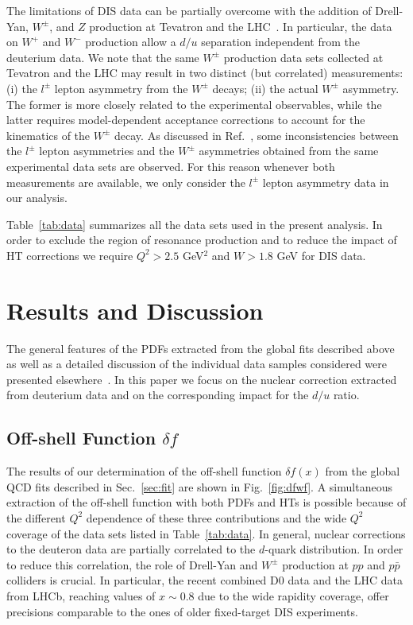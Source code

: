 \documentclass[%
      aps,
      prd,
      floatfix,
      preprintnumbers,
      preprint,
      showpacs,
      nofootinbib,
      tightenlines,
      amssymb,
      amsmath
]{revtex4-1}
\begin{document}
The limitations of DIS data can be partially overcome with the addition of Drell-Yan, $W^\pm$, and $Z$ production 
at Tevatron and the LHC~\cite{Alekhin:2017kpj,Abazov:2013rja,D0:2014kma,Aad:2011dm,Aad:2016naf,Chatrchyan:2013mza,Khachatryan:2016pev,Aaij:2015gna,Aaij:2015vua,Aaij:2015zlq}. 
In particular, the data on $W^+$ and $W^-$ 
production allow a $d/u$ separation independent from the deuterium data.  
We note that the same $W^\pm$ production data sets collected at Tevatron and the LHC may result 
in two distinct (but correlated) measurements: (i) the $l^\pm$ lepton asymmetry from the $W^\pm$ decays;  
(ii) the actual $W^\pm$ asymmetry. The former is more closely related to the experimental 
observables, while the latter requires model-dependent acceptance corrections to account 
for the kinematics of the $W^\pm$ decay. As discussed in Ref.~\cite{Alekhin:2015cza},  
some inconsistencies between the $l^\pm$ lepton asymmetries and the $W^\pm$ asymmetries obtained 
from the same experimental data sets are observed. For this reason whenever both measurements are available, 
we only consider the $l^\pm$ lepton asymmetry data in our analysis.  

Table~\ref{tab:data} summarizes all the data sets used in the present analysis. 
In order to exclude the region of resonance production and to reduce the impact of HT corrections 
we require $Q^2>2.5$ GeV$^2$ and $W>1.8$ GeV for DIS data. 


\section{Results and Discussion}
\label{sec:res}

The general features of the PDFs extracted from the global fits described above as well as a detailed 
discussion of the individual data samples considered were presented elsewhere~\cite{Alekhin:2017kpj}.
In this paper we focus on the nuclear correction extracted from deuterium data and on the corresponding 
impact for the $d/u$ ratio. 


\subsection{Off-shell Function $\delta f$}
\label{sec:deltaf}

The results of our determination of the off-shell function $\delta f(x)$ from the global 
QCD fits described in Sec.~\ref{sec:fit} are shown in Fig.~\ref{fig:dfwf}. A simultaneous 
extraction of the off-shell function with both PDFs and HTs is possible because of the different 
$Q^2$ dependence of these three contributions and the wide $Q^2$ coverage of the data 
sets listed in Table~\ref{tab:data}. In general, nuclear corrections to the deuteron data are 
partially correlated to the $d$-quark distribution. In order to reduce this correlation, the role of 
Drell-Yan and $W^\pm$ production at $pp$ and $p\bar{p}$ colliders is crucial. In particular, the 
recent combined D0 data and the LHC data from LHCb, reaching values of $x\sim 0.8$ 
due to the wide rapidity coverage, offer precisions comparable to the ones of older fixed-target 
DIS experiments. 
\end{document}
